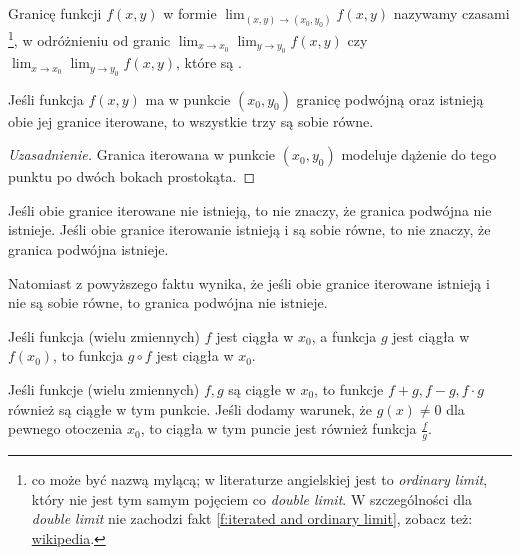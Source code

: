 Granicę funkcji $f(x, y)$ w formie $\lim_{(x, y) \to (x_0, y_0)} f(x, y)$ nazywamy czasami \footnote{co może być nazwą mylącą; w literaturze angielskiej jest to \textit{ordinary limit}, który nie jest tym samym pojęciem co \textit{double limit}. W szczególności dla \textit{double limit} nie zachodzi fakt \ref{f:iterated and ordinary limit}, zobacz też: \href{https://en.wikipedia.org/wiki/Iterated_limit\#Limit_of_function}{wikipedia}.}, w odróżnieniu od granic $\lim_{x\to x_0} \lim_{y\to y_0} f(x, y)$ czy $\lim_{x\to x_0} \lim_{y\to y_0} f(x, y)$, które są .

\begin{fact}
    \label{f:iterated and ordinary limit}
    Jeśli funkcja $f(x, y)$ ma w punkcie $(x_0, y_0)$ granicę podwójną oraz istnieją obie jej granice iterowane, to wszystkie trzy są sobie równe.
\end{fact}
\begin{proof}[Uzasadnienie]
    Granica iterowana w punkcie $(x_0, y_0)$ modeluje dążenie do tego punktu po dwóch bokach prostokąta.
\end{proof}

\begin{remark*}
    Jeśli obie granice iterowane nie istnieją, to nie znaczy, że granica podwójna nie istnieje. Jeśli obie granice iterowanie istnieją i są sobie równe, to nie znaczy, że granica podwójna istnieje.

    Natomiast z powyższego faktu wynika, że jeśli obie granice iterowane istnieją i nie są sobie równe, to granica podwójna nie istnieje.
\end{remark*}

\begin{fact}
    Jeśli funkcja (wielu zmiennych) $f$ jest ciągła w $x_0$, a funkcja $g$ jest ciągła w $f(x_0)$, to funkcja $g\circ f$ jest ciągła w $x_0$.
\end{fact}

\begin{fact}
    Jeśli funkcje (wielu zmiennych) $f, g$ są ciągłe w $x_0$, to funkcje $f+g, f-g, f\cdot g$ również są ciągłe w tym punkcie. Jeśli dodamy warunek, że $g(x) \neq 0$ dla pewnego otoczenia $x_0$, to ciągła w tym puncie jest również funkcja $\frac{f}{g}$.
\end{fact}